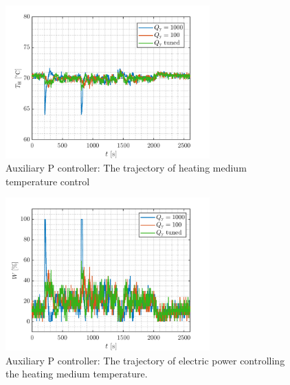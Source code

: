 \documentclass[a4paper,10pt]{article}
\begin{document}
{		\begin{figure}
			\begin{center}
				\includegraphics[width=0.7\textwidth]{images/Th}
				\caption{Auxiliary P controller: The trajectory of heating medium temperature control }
				\label{fig:Th}
			\end{center}
		\end{figure}
	
		\begin{figure}
			\begin{center}
				\includegraphics[width=0.7\textwidth]{images/W}
				\caption{Auxiliary P controller: The trajectory of electric power controlling the heating medium temperature.}
				\label{fig:W}
			\end{center}
		\end{figure}	

	}
	
	
	
	
	
\end{document}
